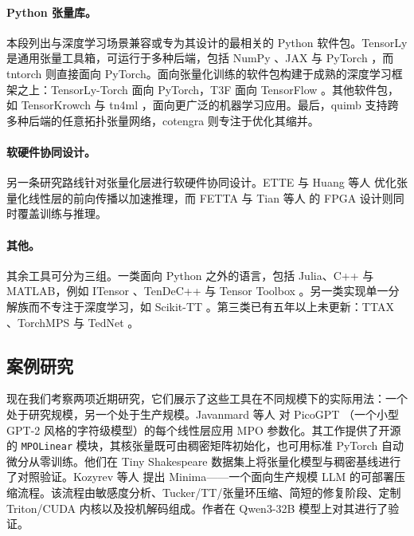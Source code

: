 \documentclass[11pt]{article}
\begin{document}
\paragraph{Python 张量库。}本段列出与深度学习场景兼容或专为其设计的最相关的 Python 软件包。TensorLy \cite{kossaifi2019tensorly} 是通用张量工具箱，可运行于多种后端，包括 NumPy \cite{harris2020numpy}、JAX \cite{bradbury2018jax} 与 PyTorch \cite{paszke2019pytorch}，而 tntorch \cite{usvyatsov2022tntorch} 则直接面向 PyTorch。面向张量化训练的软件包构建于成熟的深度学习框架之上：TensorLy-Torch \cite{kossaifi2024tensorlytorch} 面向 PyTorch，T3F \cite{novikov2020t3f} 面向 TensorFlow \cite{abadi2016tensorflow}。其他软件包，如 TensorKrowch \cite{pareja2024tensorkrowch} 与 tn4ml \cite{puljak2025tn4ml}，面向更广泛的机器学习应用。最后，quimb \cite{gray2018quimb} 支持跨多种后端的任意拓扑张量网络，cotengra \cite{gray2021hyperoptimized} 则专注于优化其缩并。

\paragraph{软硬件协同设计。}另一条研究路线针对张量化层进行软硬件协同设计。ETTE \cite{gong2023ette} 与 Huang 等人 \cite{huang2025gvsa} 优化张量化线性层的前向传播以加速推理，而 FETTA \cite{lu2026fetta} 与 Tian 等人 \cite{tian2025fpga} 的 FPGA 设计则同时覆盖训练与推理。

\paragraph{其他。}其余工具可分为三组。一类面向 Python 之外的语言，包括 Julia、C++ 与 MATLAB，例如 ITensor \cite{fishman2022itensor}、TenDeC++ \cite{huang2019tendec} 与 Tensor Toolbox \cite{bader2026tensortoolbox}。另一类实现单一分解族而不专注于深度学习，如 Scikit-TT \cite{gelss2019scikittt}。第三类已有五年以上未更新：TTAX \cite{novikov2021ttax}、TorchMPS \cite{miller2019torchmps} 与 TedNet \cite{yu2022tednet}。

\subsection{案例研究}

现在我们考察两项近期研究，它们展示了这些工具在不同规模下的实际用法：一个处于研究规模，另一个处于生产规模。Javanmard 等人 \cite{javanmard2026mpopicogpt} 对 PicoGPT \cite{osborne2026picogptjl}（一个小型 GPT-2 风格的字符级模型）的每个线性层应用 MPO 参数化。其工作提供了开源的 \texttt{MPOLinear} 模块，其核张量既可由稠密矩阵初始化，也可用标准 PyTorch 自动微分从零训练。他们在 Tiny Shakespeare 数据集上将张量化模型与稠密基线进行了对照验证。Kozyrev 等人 \cite{kozyrev2026minima} 提出 Minima——一个面向生产规模 LLM 的可部署压缩流程。该流程由敏感度分析、Tucker/TT/张量环压缩、简短的修复阶段、定制 Triton/CUDA 内核以及投机解码组成。作者在 Qwen3-32B \cite{yang2025qwen3} 模型上对其进行了验证。
\end{document}
